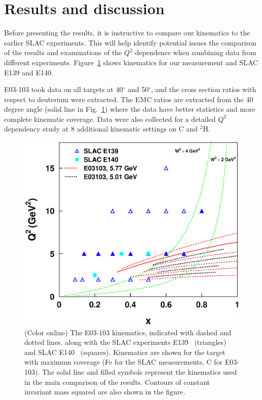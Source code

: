 \section{Results and discussion}\label{results.sec}


Before presenting the results, it is instructive to compare our kinematics to
the earlier SLAC experiments. This will help identify potential issues the
comparison of the results and examinations of the $Q^2$ dependence when
combining data from different experiments. Figure~\ref{slac_e0103_kinem_fig}
shows kinematics for our measurement and SLAC E139 and E140.

E03-103 took data on all targets at 40$^\circ$ and 50$^\circ$, and the cross
section ratios with respect to deuterium were extracted.  The EMC ratios are
extracted from the 40 degree angle (solid line in
Fig.~\ref{slac_e0103_kinem_fig}) where the data have better statistics and
more complete kinematic coverage. Data were also collected for a detailed $Q^2$
dependency study at 8 additional kinematic settings on C and $^2$H.

\begin{figure}[htbp]
\includegraphics[width=.45\textwidth]{plots/slac_e03103_x_q2.eps}
\caption{(Color online) The E03-103 kinematics, indicated with dashed and
dotted lines, along with the SLAC experiments E139~\cite{slace139} (triangles)
and SLAC E140~\cite{slace140} (squares).  Kinematics are shown for the target
with maximum coverage (Fe for the SLAC measurements, C for E03-103). The solid
line and filled symbols represent the kinematics used in the main comparison
of the results. Contours of constant invariant mass squared are also shown in
the figure.
\label{slac_e0103_kinem_fig}}
\end{figure}

